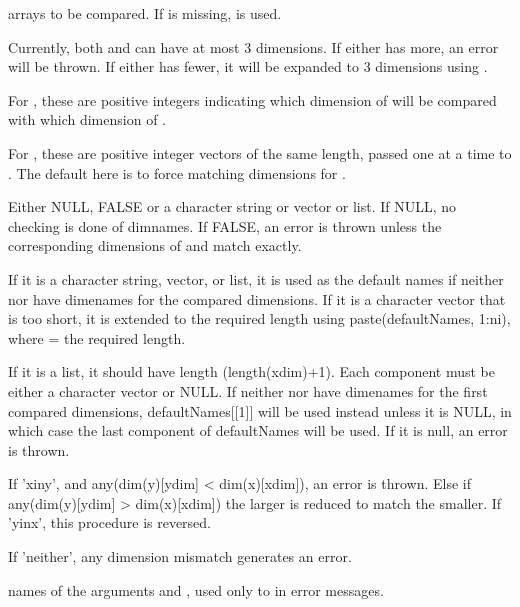 \documentclass{article}
\begin{document}
\begin{Arguments}
\begin{ldescription}
\item[\code{x, y}] arrays to be compared.  If  is missing,  is used.

Currently, both  and  can have at most 3
dimensions.  If either has more, an error will be thrown.  If either
has fewer, it will be expanded to 3 dimensions using
. 

\item[\code{xdim, ydim}] For , these are positive integers indicating which
dimension of  will be compared with which dimension of
.  

For , these are positive integer vectors of the same
length, passed one at a time to .  The default here
is to force matching dimensions for .  

\item[\code{defaultNames}] Either NULL, FALSE or a character string or vector or list.  If
NULL, no checking is done of dimnames.  If FALSE, an error is thrown
unless the corresponding dimensions of  and  match
exactly. 

If it is a character string, vector, or list, it is used as the
default names if neither  nor  have dimenames for
the compared dimensions.  If it is a character vector that is too
short, it is extended to the required length using
paste(defaultNames, 1:ni), where  = the required length. 

If it is a list, it should have length (length(xdim)+1).  Each
component must be either a character vector or NULL.  If neither
 nor  have dimenames for the first compared
dimensions, defaultNames[[1]] will be used instead unless it is
NULL, in which case the last component of defaultNames will be
used.  If it is null, an error is thrown.  

\item[\code{subset}] If 'xiny', and any(dim(y)[ydim] < dim(x)[xdim]), an error is
thrown.  Else if any(dim(y)[ydim] > dim(x)[xdim]) the larger is
reduced to match the smaller.  If 'yinx', this procedure is
reversed.

If 'neither', any dimension mismatch generates an error.  

\item[\code{xName, yName}] names of the arguments  and , used only to in error
messages.  

\end{ldescription}
\end{Arguments}
\end{document}
